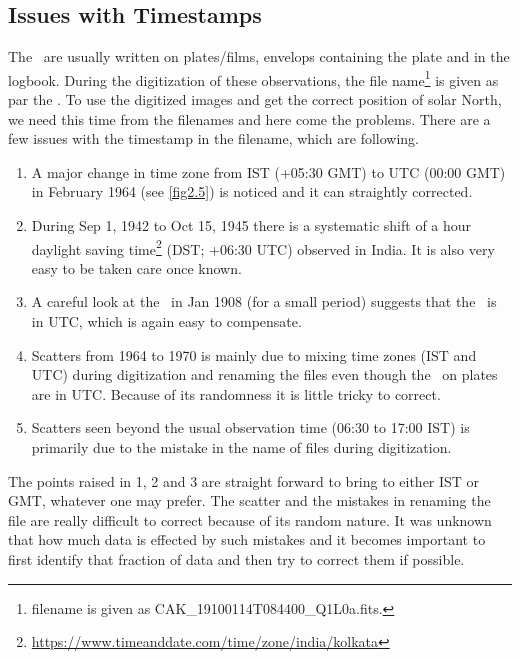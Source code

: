 \subsection{Issues with Timestamps}

The \tobs\ are usually written on plates/films, envelops containing the plate and in the logbook. During the digitization of these observations, the file name\footnote{filename is given as CAK\_19100114T084400\_Q1L0a.fits.} is given as par the \tobs. To use the digitized images and get the correct position of solar North, we need this time from the filenames and here come the problems. There are a few issues with the timestamp in the filename, which are following.

\begin{enumerate}%
    \item  A major change in time zone from IST (+05:30 GMT) to UTC (00:00 GMT) in February 1964 (see \autoref{fig2.5}) is noticed and it can straightly corrected.
    
    \item During Sep 1, 1942 to Oct 15, 1945 there is a systematic shift of a hour daylight saving time\footnote{\url{https://www.timeanddate.com/time/zone/india/kolkata}} (DST; +06:30 UTC) observed in India. It is also very easy to be taken care once known.
    
    \item A careful look at the \tobs\ in Jan 1908 (for a small period) suggests that the \tobs\ is in UTC, which is again easy to compensate.
    
    \item Scatters from 1964 to 1970 is mainly due to mixing time zones (IST and UTC) during digitization and renaming the files even though the \tobs\ on plates are in UTC. Because of its randomness it is little tricky to correct. 
    
    \item Scatters seen beyond the usual observation time (06:30 to 17:00 IST) is primarily due to the mistake in the name of files during digitization. 
\end{enumerate}
 The points raised in 1, 2 and 3 are straight forward to bring to either IST or GMT, whatever one may prefer. The scatter and the mistakes in renaming the file are really difficult to correct because of its random nature. It was unknown that how much data is effected by such mistakes and it becomes important to first identify that fraction of data and then try to correct them if possible.  

